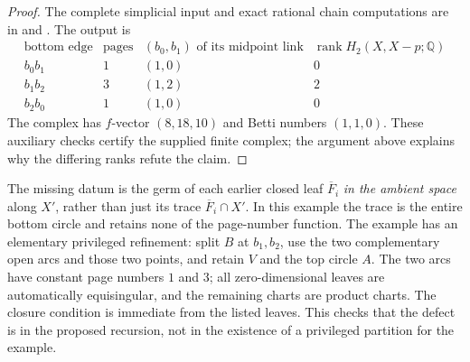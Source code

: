\begin{proof}
The complete simplicial input and exact rational chain computations
are in  and
.  The output is
\[
\begin{array}{c|c|c|c}
\text{bottom edge}&\text{pages}&
 (b_0,b_1)\text{ of its midpoint link}&
 \operatorname{rank}H_2(X,X-p;\mathbb Q)\\\hline
b_0b_1&1&(1,0)&0\\
b_1b_2&3&(1,2)&2\\
b_2b_0&1&(1,0)&0
\end{array}
\]
The complex has $f$-vector $(8,18,10)$ and Betti numbers $(1,1,0)$.
These auxiliary checks certify the supplied finite complex; the
argument above explains why the differing ranks refute the claim.
\end{proof}

The missing datum is the germ of each earlier closed leaf
$\overline F_i$ \emph{in the ambient space} along $X'$, rather than
just its trace $\overline F_i\cap X'$.  In this example the trace is
the entire bottom circle and retains none of the page-number
function.  The example has an elementary privileged refinement:
split $B$ at $b_1,b_2$, use the two complementary open arcs and those
two points, and retain $V$ and the top circle $A$.  The two arcs have
constant page numbers $1$ and $3$; all zero-dimensional leaves are
automatically equisingular, and the remaining charts are product
charts.  The closure condition is immediate from the listed leaves.
This checks that the defect is in the proposed recursion, not in
the existence of a privileged partition for the example.

